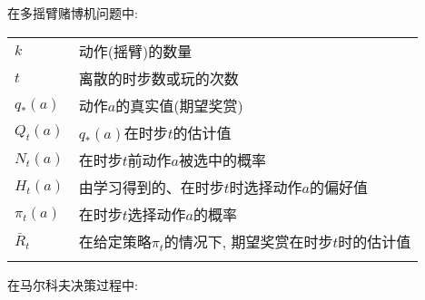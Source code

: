 \noindent 在多摇臂赌博机问题中:

\begin{longtable}[l]{p{6em}l}
$k$      & 动作(摇臂)的数量         \\
$t$      & 离散的时步数或玩的次数     \\
$q_*(a)$ & 动作$a$的真实值(期望奖赏)\\
$Q_t(a)$ & $q_*(a)$在时步$t$的估计值       \\
$N_t(a)$ & 在时步$t$前动作$a$被选中的概率    \\
$H_t(a)$ & 由学习得到的、在时步$t$时选择动作$a$的偏好值 \\
$\pi_t(a)$ & 在时步$t$选择动作$a$的概率 \\
$\bar{R}_t$ & 在给定策略$\pi_t$的情况下, 期望奖赏在时步$t$时的估计值 \\
 & \\
\end{longtable} 

\noindent 在马尔科夫决策过程中:

